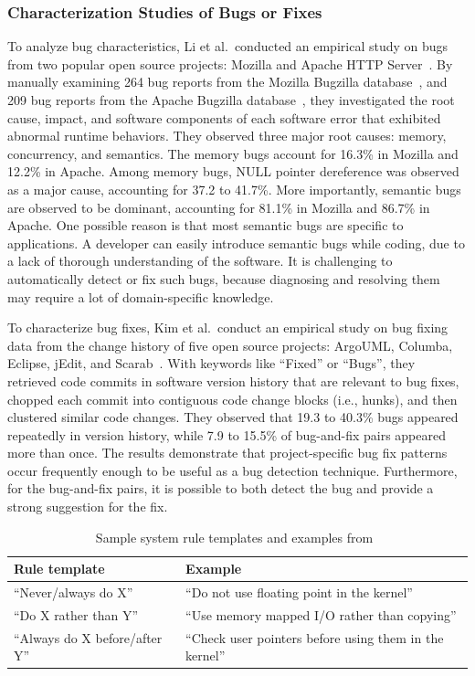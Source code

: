 \documentclass[runningheads,a4paper]{llncs}
\begin{document}
\subsubsection{Characterization Studies of Bugs or Fixes}
To analyze bug characteristics, Li et al.~conducted an empirical study on bugs from two popular open source projects: Mozilla and Apache HTTP Server~\cite{Li2006:TCE}. By manually examining 264 bug reports from the Mozilla Bugzilla database~\cite{mozilla}, and 209 bug reports from the Apache Bugzilla database~\cite{asf}, they investigated the root cause, impact, and software components of each software error that exhibited abnormal runtime behaviors. They observed three major root causes: memory, concurrency, and semantics. The memory bugs account for 16.3\% in Mozilla and 12.2\% in Apache. Among memory bugs, NULL pointer dereference was observed as a major cause, accounting for 37.2 to 41.7\%. More importantly, semantic bugs are observed to be dominant, accounting for 81.1\% in Mozilla and 86.7\% in Apache. One possible reason is that most semantic bugs are specific to applications. A developer can easily introduce semantic bugs while coding, due to a lack of thorough understanding of the software. It is challenging to automatically detect or fix such bugs, because diagnosing and resolving them may require a lot of domain-specific knowledge.

To characterize bug fixes, Kim et al.~conduct an empirical study on bug fixing data from the change history of five open source projects: ArgoUML, Columba, Eclipse, jEdit, and Scarab~\cite{Kim2006:MBF}. With keywords like ``Fixed'' or ``Bugs'', they retrieved code commits in software version history that are relevant to bug fixes, chopped each commit into contiguous code change blocks (i.e., hunks), and then clustered similar code changes. They observed that 19.3 to 40.3\% bugs appeared repeatedly in version history, while 7.9 to 15.5\% of bug-and-fix pairs appeared more than once. The results demonstrate that project-specific bug fix patterns occur frequently enough to be useful as a bug detection technique. Furthermore, for the bug-and-fix pairs, it is possible to both detect the bug and provide a strong suggestion for the fix. 

\begin{table}[]
\centering
\caption{Sample system rule templates and examples from~\cite{Engler2000:CSR}}
\label{tab:rule}
\begin{tabular}{l|l}
\toprule
Rule template                  & Example                                                 \\ \hline
``Never/always do X''          & ``Do not use floating point in the kernel''             \\\hline
``Do X rather than Y''         & ``Use memory mapped I/O rather than copying''           \\ \hline
``Always do X before/after Y'' & ``Check user pointers before using them in the kernel''\\
\bottomrule
\end{tabular}
\end{table} 
\end{document}
